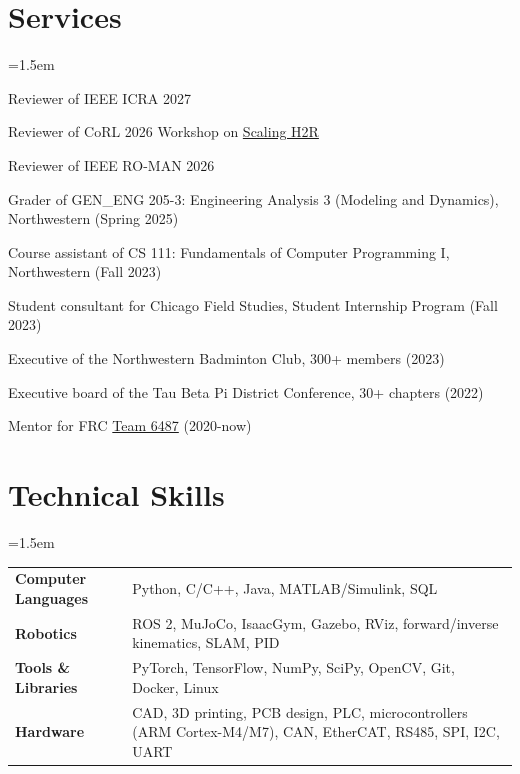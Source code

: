 \documentclass[10pt,letterpaper]{article}
\newenvironment{block}{\begin{list}{}{\leftmargin=1.5em\rightmargin=0pt\itemsep=0pt\topsep=0pt}\item[]}{\end{list}}
\begin{document}
\section{Services}
\begin{block}
Reviewer of IEEE ICRA 2027\par\vspace{0.4em}
Reviewer of CoRL 2026 Workshop on \href{https://scaling-h2r-corl.github.io/}{Scaling H2R}\par\vspace{0.4em}
Reviewer of IEEE RO-MAN 2026\par\vspace{0.4em}
Grader of GEN\_ENG 205-3: Engineering Analysis 3 (Modeling and Dynamics), Northwestern (Spring 2025)\par\vspace{0.4em}
Course assistant of CS 111: Fundamentals of Computer Programming I, Northwestern (Fall 2023)\par\vspace{0.4em}
Student consultant for Chicago Field Studies, Student Internship Program (Fall 2023)\par\vspace{0.4em}
Executive of the Northwestern Badminton Club, 300+ members (2023)\par\vspace{0.4em}
Executive board of the Tau Beta Pi District Conference, 30+ chapters (2022)\par\vspace{0.4em}
Mentor for FRC \href{https://www.thebluealliance.com/team/6487}{Team 6487} (2020-now)
\end{block}

\section{Technical Skills}
\begin{block}
\begin{tabularx}{\linewidth}{@{}l >{\raggedright\arraybackslash}X@{}}
\textbf{Computer Languages} & Python, C/C++, Java, MATLAB/Simulink, SQL \\
\textbf{Robotics} & ROS 2, MuJoCo, IsaacGym, Gazebo, RViz, forward/inverse kinematics, SLAM, PID \\
\textbf{Tools \& Libraries} & PyTorch, TensorFlow, NumPy, SciPy, OpenCV, Git, Docker, Linux \\
\textbf{Hardware} & CAD, 3D printing, PCB design, PLC, microcontrollers (ARM Cortex-M4/M7), CAN, EtherCAT, RS485, SPI, I2C, UART \\
\end{tabularx}
\end{block}
\end{document}
